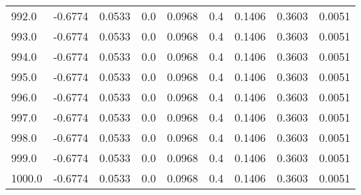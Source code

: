 \begin{longtable}{lrrrrrrrr}
992.0 & -0.6774 & 0.0533 & 0.0 & 0.0968 & 0.4 & 0.1406 & 0.3603 & 0.0051 \\
993.0 & -0.6774 & 0.0533 & 0.0 & 0.0968 & 0.4 & 0.1406 & 0.3603 & 0.0051 \\
994.0 & -0.6774 & 0.0533 & 0.0 & 0.0968 & 0.4 & 0.1406 & 0.3603 & 0.0051 \\
995.0 & -0.6774 & 0.0533 & 0.0 & 0.0968 & 0.4 & 0.1406 & 0.3603 & 0.0051 \\
996.0 & -0.6774 & 0.0533 & 0.0 & 0.0968 & 0.4 & 0.1406 & 0.3603 & 0.0051 \\
997.0 & -0.6774 & 0.0533 & 0.0 & 0.0968 & 0.4 & 0.1406 & 0.3603 & 0.0051 \\
998.0 & -0.6774 & 0.0533 & 0.0 & 0.0968 & 0.4 & 0.1406 & 0.3603 & 0.0051 \\
999.0 & -0.6774 & 0.0533 & 0.0 & 0.0968 & 0.4 & 0.1406 & 0.3603 & 0.0051 \\
1000.0 & -0.6774 & 0.0533 & 0.0 & 0.0968 & 0.4 & 0.1406 & 0.3603 & 0.0051 \\
\end{longtable}